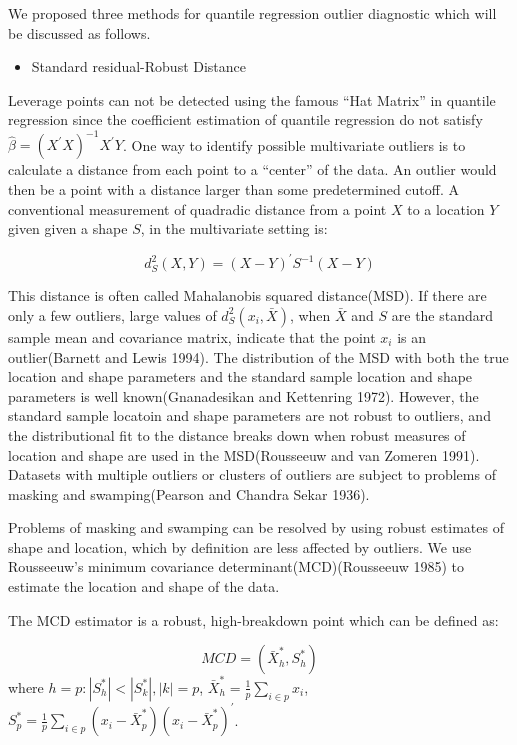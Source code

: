 \documentclass[11pt,a4paper,]{article}
\providecommand{\tightlist}{%
  \setlength{\itemsep}{0pt}\setlength{\parskip}{0pt}}
\theoremstyle{definition}
\theoremstyle{definition}
\theoremstyle{remark}
\begin{document}
We proposed three methods for quantile regression outlier diagnostic
which will be discussed as follows.

\begin{itemize}
\tightlist
\item
  Standard residual-Robust Distance
\end{itemize}

Leverage points can not be detected using the famous ``Hat Matrix'' in
quantile regression since the coefficient estimation of quantile
regression do not satisfy \(\hat{\beta}=(X^{'}X)^{-1}X^{'}Y\). One way
to identify possible multivariate outliers is to calculate a distance
from each point to a ``center'' of the data. An outlier would then be a
point with a distance larger than some predetermined cutoff. A
conventional measurement of quadradic distance from a point \(X\) to a
location \(Y\) given given a shape \(S\), in the multivariate setting
is:

\[d^{2}_{S}(X,Y)=(X-Y)^{'}S^{-1}(X-Y)\]

This distance is often called Mahalanobis squared distance(MSD). If
there are only a few outliers, large values of
\(d^{2}_{S}(x_i, \bar{X})\), when \(\bar{X}\) and \(S\) are the standard
sample mean and covariance matrix, indicate that the point \(x_i\) is an
outlier(Barnett and Lewis 1994). The distribution of the MSD with both
the true location and shape parameters and the standard sample location
and shape parameters is well known(Gnanadesikan and Kettenring 1972).
However, the standard sample locatoin and shape parameters are not
robust to outliers, and the distributional fit to the distance breaks
down when robust measures of location and shape are used in the
MSD(Rousseeuw and van Zomeren 1991). Datasets with multiple outliers or
clusters of outliers are subject to problems of masking and
swamping(Pearson and Chandra Sekar 1936).

Problems of masking and swamping can be resolved by using robust
estimates of shape and location, which by definition are less affected
by outliers. We use Rousseeuw's minimum covariance
determinant(MCD)(Rousseeuw 1985) to estimate the location and shape of
the data.

The MCD estimator is a robust, high-breakdown point which can be defined
as:

\[MCD = (\bar{X}^{*}_{h}, S^{*}_{h})\] where
\(h={p: |S^{*}_{h}|<|S^{*}_{k}|,|k|=p}\),
\(\bar{X}^{*}_{h}=\frac{1}{p}\sum_{i \in p}x_{i}\),
\(S^{*}_{p}=\frac{1}{p}\sum_{i \in p}(x_i-\bar{X}^{*}_{p})(x_i-\bar{X}^{*}_{p})^{'}\).
\end{document}
